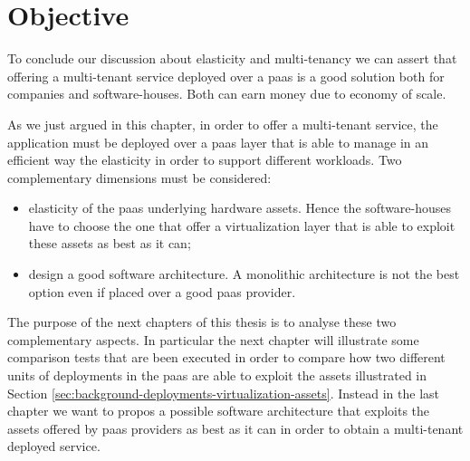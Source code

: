 %
%
\section{Objective}
\label{sec:elasticity-objective}
To conclude our discussion about elasticity and multi-tenancy we can assert that offering a multi-tenant
service deployed over a \ac{paas} is a good solution both for companies and software-houses. Both can
earn money due to economy of scale.

As we just argued in this chapter, in order to offer a multi-tenant service, the application must be
deployed over a \ac{paas} layer that is able to manage in an efficient way the elasticity in order to
support different workloads. Two complementary dimensions must be considered:

\begin{itemize}
	\item{elasticity of the \ac{paas} underlying hardware assets. Hence the software-houses have to
		choose the one that offer a virtualization layer that is able to exploit these assets as best as
		it can;}
	\item{design a good software architecture. A monolithic architecture is not the best option even if
		placed over a good \ac{paas} provider.}
\end{itemize}

The purpose of the next chapters of this thesis is to analyse these two complementary aspects. In particular
the next chapter will illustrate some comparison tests that are been executed in order to compare how two
different units of deployments in the \ac{paas} are able to exploit the assets illustrated in Section
\ref{sec:background-deployments-virtualization-assets}. Instead in the last chapter we want to propos
a possible software architecture that exploits the assets offered by \ac{paas} providers as best as it
can in order to obtain a multi-tenant deployed service.